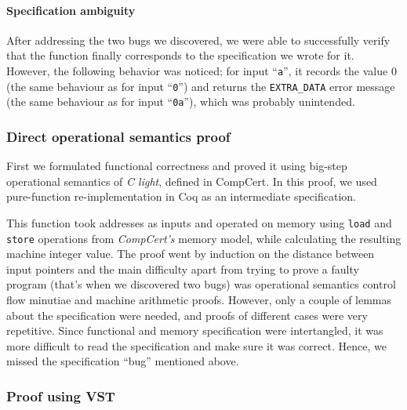 \documentclass[10p,conference]{IEEEtran}
\begin{document}
\paragraph{Specification ambiguity}

After addressing the two bugs we discovered, we were able to
successfully verify that the function finally corresponds to the
specification we wrote for it. However, the following
behavior was noticed; for input ``\texttt{a}'', it records the value $0$ (the same behaviour
as for input ``\texttt{0}'') and returns the
\texttt{EXTRA\_DATA} error message (the same behaviour as for input
``\texttt{0a}''), which was probably unintended.
  
\subsubsection{Direct operational semantics proof}

First we formulated functional correctness and proved it using
big-step operational semantics of \textit{C light}, defined in CompCert. In this proof, we used pure-function
re-implementation in Coq as an intermediate specification.

This function took addresses as inputs and operated on memory using
\texttt{load} and \texttt{store} operations from \textit{CompCert's}
memory model, while calculating the resulting machine integer
value. The proof went by induction on the distance between input
pointers and the main difficulty apart from trying to prove a faulty
program (that's when we discovered two bugs) was operational semantics
control flow minutiae and machine arithmetic proofs. However, only a
couple of lemmas about the specification were needed, and proofs of
different cases were very repetitive. Since functional and memory
specification were intertangled, it was more difficult to read the
specification and make sure it was correct. Hence, we missed the
specification ``bug'' mentioned above.

\subsubsection{Proof using VST}
\end{document}

